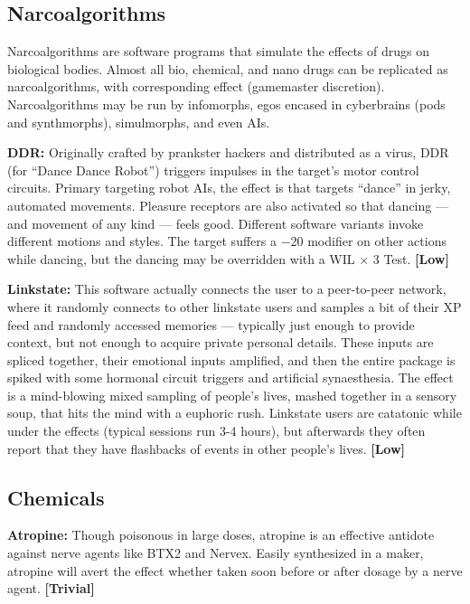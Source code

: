 \subsection{Narcoalgorithms}
\label{sec:narcoalgorithms}

Narcoalgorithms are software programs that simulate the effects of drugs on biological bodies. Almost all bio, chemical, and nano drugs can be replicated as narcoalgorithms, with corresponding effect (gamemaster discretion). Narcoalgorithms may be run by infomorphs, egos encased in cyberbrains (pods and synthmorphs), simulmorphs, and even AIs.

\textbf{DDR:} Originally crafted by prankster hackers and distributed as a virus, DDR (for ``Dance Dance Robot'') triggers impulses in the target’s motor control circuits. Primary targeting robot AIs, the effect is that targets ``dance'' in jerky, automated movements. Pleasure receptors are also activated so that dancing ---  and movement of any kind --- feels good. Different software variants invoke different motions and styles. The target suffers a $-$20 modifier on other actions while dancing, but the dancing may be overridden with a WIL $\times$ 3 Test. \textbf{[Low]}

\textbf{Linkstate:} This software actually connects the user to a peer-to-peer network, where it randomly connects to other linkstate users and samples a bit of their XP feed and randomly accessed memories --- typically just enough to provide context, but not enough to acquire private personal details. These inputs are spliced together, their emotional inputs amplified, and then the entire package is spiked with some hormonal circuit triggers and artificial synaesthesia. The effect is a mind-blowing mixed sampling of people’s lives, mashed together in a sensory soup, that hits the mind with a euphoric rush. Linkstate users are catatonic while under the effects (typical sessions run 3-4 hours), but afterwards they often report that they have flashbacks of events in other people’s lives. \textbf{[Low]}


\subsection{Chemicals}
\label{sec:chemicals}

\textbf{Atropine:} Though poisonous in large doses, atropine is an effective antidote against nerve agents like BTX2 and Nervex. Easily synthesized in a maker, atropine will avert the effect whether taken soon before or after dosage by a nerve agent. \textbf{[Trivial]}

